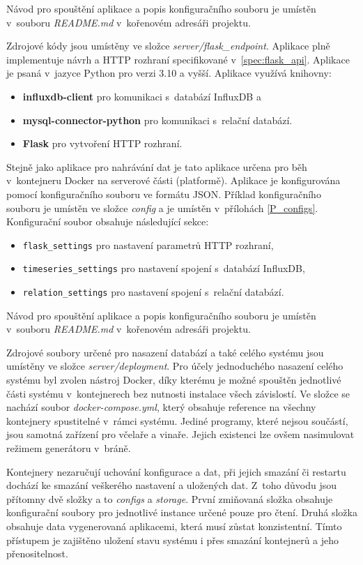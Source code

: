Návod pro spouštění aplikace a popis konfiguračního souboru je umístěn v~souboru \textit{README.md} v~kořenovém adresáři projektu.

Zdrojové kódy jsou umístěny ve složce \textit{server/flask\_endpoint}. Aplikace plně implementuje návrh a HTTP rozhraní specifikované v~\ref{spec:flask_api}. Aplikace je psaná v~jazyce Python pro verzi 3.10 a vyšší. Aplikace využívá knihovny:
\begin{itemize}
    \item \textbf{influxdb-client} pro komunikaci s~databází InfluxDB a
    \item \textbf{mysql-connector-python} pro komunikaci s~relační databází.
    \item \textbf{Flask} pro vytvoření HTTP rozhraní.
\end{itemize}
Stejně jako aplikace pro nahrávání dat je tato aplikace určena pro běh v~kontejneru Docker na serverové části (platformě). Aplikace je konfigurována pomocí konfiguračního souboru ve formátu JSON. Příklad konfiguračního souboru je umístěn ve složce \textit{config} a je umístěn v~přílohách \ref{P_configs}. Konfigurační soubor obsahuje následující sekce:
\begin{itemize}
    \item \texttt{flask\_settings} pro nastavení parametrů HTTP rozhraní,
    \item \texttt{timeseries\_settings} pro nastavení spojení s~databází InfluxDB,
    \item \texttt{relation\_settings} pro nastavení spojení s~relační databází.
\end{itemize}

Návod pro spouštění aplikace a popis konfiguračního souboru je umístěn v~souboru \textit{README.md} v~kořenovém adresáři projektu.

Zdrojové soubory určené pro nasazení databází a také celého systému jsou umístěny ve složce \textit{server/deployment}. Pro účely jednoduchého nasazení celého systému byl zvolen nástroj Docker, díky kterému je možné spouštěn jednotlivé části systému v~kontejnerech bez nutnosti instalace všech závislostí. Ve složce se nachází soubor \textit{docker-compose.yml}, který obsahuje reference na všechny kontejnery spustitelné v~rámci systému. Jediné programy, které nejsou součástí, jsou samotná zařízení pro včelaře a vinaře. Jejich existenci lze ovšem nasimulovat režimem generátoru v~bráně. 

Kontejnery nezaručují uchování konfigurace a dat, při jejich smazání či restartu dochází ke smazání veškerého nastavení a uložených dat. Z~toho důvodu jsou přítomny dvě složky a to \textit{configs} a \textit{storage}. První zmiňovaná složka obsahuje konfigurační soubory pro jednotlivé instance určené pouze pro čtení. Druhá složka obsahuje data vygenerovaná aplikacemi, která musí zůstat konzistentní. Tímto přístupem je zajištěno uložení stavu systému i přes smazání kontejnerů a jeho přenositelnost.

